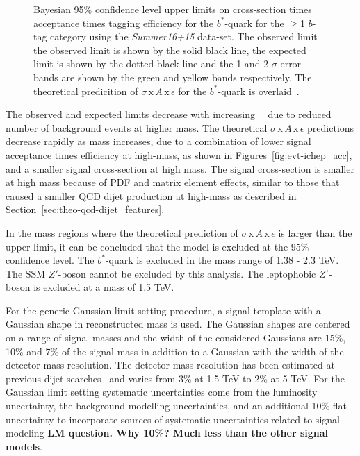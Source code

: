 \begin{figure}[!ht]
   \caption[Bayesian 95\% confidence level upper limits on cross-section times acceptance times tagging efficiency
    for the $b^*$-quark for the $\geq$1 $b$-tag category using the \textit{Summer16+15} data-set.
    The observed limit the observed limit is shown by the solid black line,
    the expected limit is shown by the dotted black line
    and the 1 and 2 $\sigma$ error bands are shown by the green and yellow bands respectively.
    The theoretical predicition of $\sigma\,\text{x}\,\mathit{A}\,\text{x}\,\epsilon$
    for the $b^*$-quark is overlaid.]
           {Bayesian 95\% confidence level upper limits on cross-section times acceptance times tagging efficiency
    for the $b^*$-quark for the $\geq$1 $b$-tag category using the \textit{Summer16+15} data-set.
    The observed limit the observed limit is shown by the solid black line,
    the expected limit is shown by the dotted black line
    and the 1 and 2 $\sigma$ error bands are shown by the green and yellow bands respectively.
    The theoretical predicition of $\sigma\,\text{x}\,\mathit{A}\,\text{x}\,\epsilon$
    for the $b^*$-quark is overlaid~\cite{dibjet-ichep_conf}.
  }
  \label{fig:lim-summer_bstar}
\end{figure}

The observed and expected limits decrease with increasing~\mjj~
due to reduced number of background events at higher mass.
The theoretical $\sigma\,\text{x}\,\mathit{A}\,\text{x}\,\epsilon$ predictions
decrease rapidly as mass increases, due to a combination of
lower signal acceptance times efficiency at high-mass, as shown in Figures~\ref{fig:evt-ichep_acc},
and a smaller signal cross-section at high mass.
The signal cross-section is smaller at high mass because of PDF and matrix element effects,
similar to those that caused a smaller QCD dijet production at high-mass as described in
 Section~\ref{sec:theo-qcd-dijet_features}.

In the mass regions where the theoretical prediction of $\sigma\,\text{x}\,\mathit{A}\,\text{x}\,\epsilon$
is larger than the upper limit, it can be concluded that the model is excluded at the 95\% confidence level.
The \mbox{$b^*$-quark} is excluded in the mass range of 1.38 - 2.3 TeV.
The SSM $Z'$-boson cannot be excluded by this analysis.
The leptophobic $Z'$-boson is excluded at a mass of 1.5 TeV.

\FloatBarrier

For the generic Gaussian limit setting procedure,
a signal template with a Gaussian shape in reconstructed mass is used.
The Gaussian shapes are centered on a range of signal masses
and the width of the considered Gaussians are
15\%, 10\% and 7\% of the signal mass
in addition to a Gaussian with the width of the detector mass resolution.
The detector mass resolution has been estimated
at previous dijet searches~\cite{dijet-mori16_paper}
and varies from 3\% at 1.5 TeV to 2\% at 5 TeV.
For the Gaussian limit setting
systematic uncertainties come from the luminosity uncertainty,
the background modelling uncertainties,
and an additional 10\% flat uncertainty to
incorporate sources of systematic uncertainties related to signal modeling
\textbf{LM question. Why 10\%? Much less than the other signal models}.

